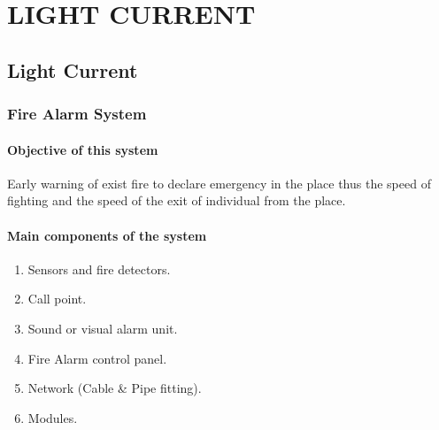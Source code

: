 \documentclass[12pt,fleqn]{book} %
\begin{document}
\part{LIGHT CURRENT}
\chapter{Light Current}
\section{Fire Alarm System}
\subsection{Objective of this system}
Early warning of exist fire to declare emergency in the place thus the speed of fighting and the speed of the exit of individual from the place.
\subsection{Main components of the system}
\begin{enumerate}
    \item Sensors and fire detectors.
    \item Call point.
    \item Sound or visual alarm unit.
    \item Fire Alarm control panel.
    \item Network (Cable & Pipe fitting).
    \item Modules.
\end{enumerate}
\end{document}
